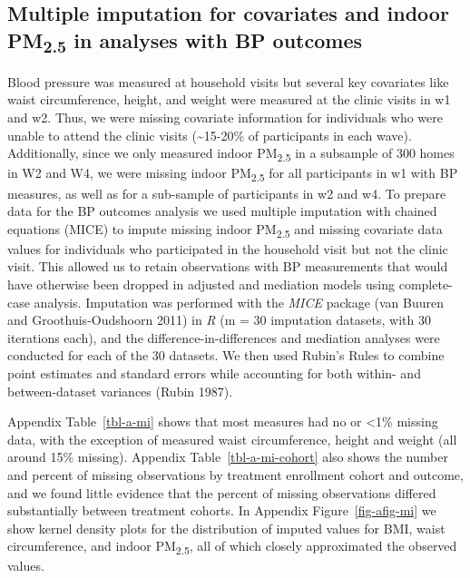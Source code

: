 \documentclass[
  letterpaper,
  DIV=11,
  numbers=noendperiod]{scrartcl}
\begin{document}
\subsection{\texorpdfstring{Multiple imputation for covariates and
indoor PM\textsubscript{2.5} in analyses with BP
outcomes}{Multiple imputation for covariates and indoor PM2.5 in analyses with BP outcomes}}\label{multiple-imputation-for-covariates-and-indoor-pm2.5-in-analyses-with-bp-outcomes}

Blood pressure was measured at household visits but several key
covariates like waist circumference, height, and weight were measured at
the clinic visits in w1 and w2. Thus, we were missing covariate
information for individuals who were unable to attend the clinic visits
(\textasciitilde15-20\% of participants in each wave). Additionally,
since we only measured indoor PM\textsubscript{2.5} in a subsample of
300 homes in W2 and W4, we were missing indoor PM\textsubscript{2.5} for
all participants in w1 with BP measures, as well as for a sub-sample of
participants in w2 and w4. To prepare data for the BP outcomes analysis
we used multiple imputation with chained equations (MICE) to impute
missing indoor PM\textsubscript{2.5} and missing covariate data values
for individuals who participated in the household visit but not the
clinic visit. This allowed us to retain observations with BP
measurements that would have otherwise been dropped in adjusted and
mediation models using complete-case analysis. Imputation was performed
with the \emph{MICE} package (van Buuren and Groothuis-Oudshoorn 2011)
in \emph{R} (m = 30 imputation datasets, with 30 iterations each), and
the difference-in-differences and mediation analyses were conducted for
each of the 30 datasets. We then used Rubin's Rules to combine point
estimates and standard errors while accounting for both within- and
between-dataset variances (Rubin 1987).

Appendix  Table~\ref{tbl-a-mi} shows that most
measures had no or \textless1\% missing data, with the exception of
measured waist circumference, height and weight (all around 15\%
missing). Appendix Table~\ref{tbl-a-mi-cohort} also shows the number and
percent of missing observations by treatment enrollment cohort and
outcome, and we found little evidence that the percent of missing
observations differed substantially between treatment cohorts. In
Appendix Figure~\ref{fig-afig-mi} we show kernel density plots for the
distribution of imputed values for BMI, waist circumference, and indoor
PM\textsubscript{2.5}, all of which closely approximated the observed
values.
\end{document}

